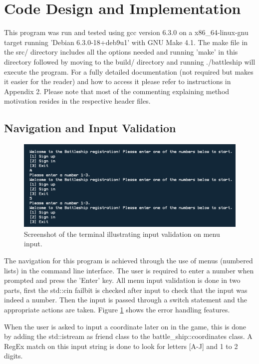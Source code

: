 \documentclass[11pt]{article} %
\begin{document}
\section{Code Design and Implementation}
This program was run and tested using gcc version 6.3.0 on a x86\_64-linux-gnu target running 'Debian 6.3.0-18+deb9u1' with GNU Make 4.1.
The make file in the src/ directory includes all the options needed and running 'make' in this directory followed
by moving to the build/ directory and running ./battleship will execute the program.
For a fully detailed documentation (not required but makes it easier for the reader)
 and how to access it please refer to instructions in Appendix 2.
Please note that most of the commenting explaining method motivation resides in
the respective header files.
\subsection{Navigation and Input Validation}
\begin{figure}[H]
\centering
\includegraphics[scale=0.6]{images/input_validation.png}
\caption{Screenshot of the terminal illustrating input validation on menu input.}
\label{fig:input_validation}
\end{figure}
The navigation for this program is achieved through the use of menus (numbered lists) in the
command line interface.
The user is required to enter a number when prompted and press the 'Enter' key.
All menu input validation is done in two parts, first the std::cin failbit is checked after input
to check that the input was indeed a number.
Then the input is passed through a switch statement and the appropriate actions are taken.
Figure \ref{fig:input_validation} shows the error handling features.
\\
\par When the user is asked to input a coordinate later on in the game, this is done by
adding the std::istream as friend class to the battle\_ship::coordinates class.
A RegEx match on this input string is done to look for letters [A-J] and 1 to 2 digits.
\end{document}
